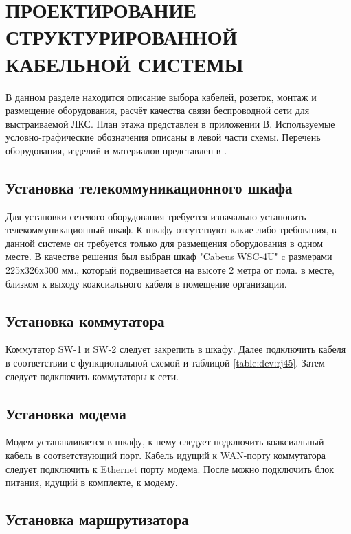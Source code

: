 \section{ПРОЕКТИРОВАНИЕ СТРУКТУРИРОВАННОЙ КАБЕЛЬНОЙ СИСТЕМЫ}
\label{sec:dev}

В данном разделе находится описание выбора кабелей, розеток, монтаж и размещение оборудования,
расчёт качества связи беспроводной сети для выстраиваемой ЛКС. План этажа представлен в приложении В. 
Используемые условно-графические обозначения описаны в левой части схемы.
Перечень оборудования, изделий и материалов представлен в \floor. 

\subsection{Установка телекоммуникационного шкафа}

Для установки сетевого оборудования требуется изначально установить телекоммуникационный шкаф. 
К шкафу отсутствуют какие либо требования, в данной системе он требуется только для 
размещения оборудования в одном месте. В качестве решения был выбран шкаф "Cabeus WSC-4U" c размерами 225х326х300 мм.,
который подвешивается на высоте 2 метра от пола. 
в месте, близком к выходу коаксиального кабеля в помещение  организации.

\subsection{Установка коммутатора}

Коммутатор SW-1 и SW-2 следует закрепить в шкафу. Далее подключить кабеля в соответствии с функциональной схемой и таблицой \ref{table:dev:rj45}.
Затем следует подключить коммутаторы к сети.

\subsection{Установка модема}

Модем устанавливается в шкафу, к нему следует подключить коаксиальный кабель в соответствующий порт.
Кабель идущий к WAN-порту коммутатора следует подключить к Ethernet порту модема. 
После можно подключить блок питания, идущий в комплекте, к модему.

\subsection{Установка маршрутизатора}

